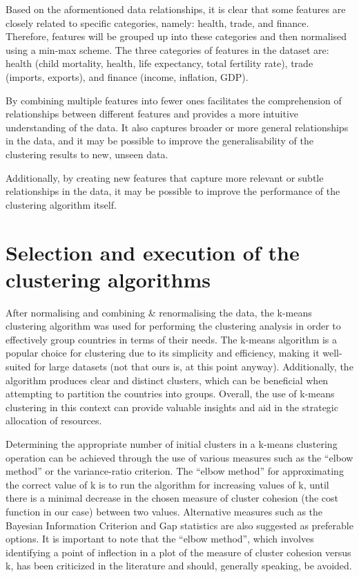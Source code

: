 \documentclass[
  course = {{DS12E Clustering Algorithms}},
  quartile = {{2}},
  assignment = 2,
  name = {{Michael Darmanis ; Vasilios Venieris}},
  studentnumber = {{7115152200004 ; 7115152200017}},
  email = {{mdarm@di.uoa.gr ; vvenieris@di.uoa.gr}},
  firstexercise = 1
]{aga-homework}
\begin{document}
Based on the aformentioned data relationships, it is clear that some features are closely related to specific categories, namely: health, trade, and finance. Therefore, features will be grouped up into these categories and then normalised using a min-max scheme. The three categories of features in the dataset are: health (child mortality, health, life expectancy, total fertility rate), trade (imports, exports), and finance (income, inflation, GDP).

By combining multiple features into fewer ones facilitates the comprehension of relationships between different features and provides a more intuitive understanding of the data. It also captures broader or more general relationships in the data, and it may be possible to improve the generalisability of the clustering results to new, unseen data.

Additionally, by creating new features that capture more relevant or subtle relationships in the data, it may be possible to improve the performance of the clustering algorithm itself.

\section{Selection and execution of the clustering algorithms}\label{sec:execute_clusters}

After normalising and combining \& renormalising the data, the k-means clustering algorithm was used for performing the clustering analysis in order to effectively group countries in terms of their needs. The k-means algorithm is a popular choice for clustering due to its simplicity and efficiency, making it well-suited for large datasets (not that ours is, at this point anyway). Additionally, the algorithm produces clear and distinct clusters, which can be beneficial when attempting to partition the countries into groups. Overall, the use of k-means clustering in this context can provide valuable insights and aid in the strategic allocation of resources.

Determining the appropriate number of initial clusters in a k-means clustering operation can be achieved through the use of various measures such as the ``elbow method'' or the variance-ratio criterion\cite{calinski}. The ``elbow method'' for approximating the correct value of k is to run the algorithm for increasing values of k, until there is a minimal decrease in the chosen measure of cluster cohesion (the cost function in our case) between two values\cite{leskovec2020mining}. Alternative measures such as the Bayesian Information Criterion and Gap statistics are also suggested as preferable options\cite{schubert}. It is important to note that the ``elbow method'', which involves identifying a point of inflection in a plot of the measure of cluster cohesion versus k, has been criticized in the literature \parencites{milligan}{ketchen} and should, generally speaking, be avoided.
\end{document}
